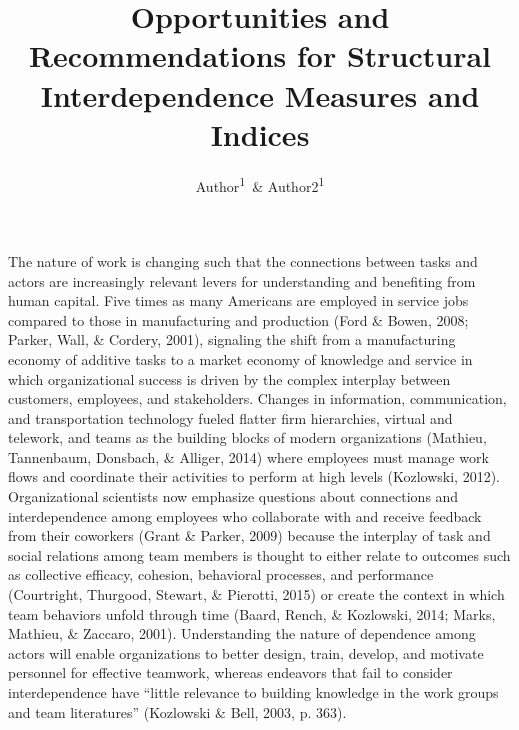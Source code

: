 \documentclass[english,,man]{apa6}
\title{Opportunities and Recommendations for Structural Interdependence
Measures and Indices}
\author{Author\textsuperscript{1}~\& Author2\textsuperscript{1}}
\date{}
\affiliation{
\vspace{0.5cm}
\textsuperscript{1} Michigan State University}
\theoremstyle{definition}
\theoremstyle{definition}
\theoremstyle{definition}
\theoremstyle{remark}
\begin{document}
\maketitle

The nature of work is changing such that the connections between tasks
and actors are increasingly relevant levers for understanding and
benefiting from human capital. Five times as many Americans are employed
in service jobs compared to those in manufacturing and production (Ford
\& Bowen, 2008; Parker, Wall, \& Cordery, 2001), signaling the shift
from a manufacturing economy of additive tasks to a market economy of
knowledge and service in which organizational success is driven by the
complex interplay between customers, employees, and stakeholders.
Changes in information, communication, and transportation technology
fueled flatter firm hierarchies, virtual and telework, and teams as the
building blocks of modern organizations (Mathieu, Tannenbaum, Donsbach,
\& Alliger, 2014) where employees must manage work flows and coordinate
their activities to perform at high levels (Kozlowski, 2012).
Organizational scientists now emphasize questions about connections and
interdependence among employees who collaborate with and receive
feedback from their coworkers (Grant \& Parker, 2009) because the
interplay of task and social relations among team members is thought to
either relate to outcomes such as collective efficacy, cohesion,
behavioral processes, and performance (Courtright, Thurgood, Stewart, \&
Pierotti, 2015) or create the context in which team behaviors unfold
through time (Baard, Rench, \& Kozlowski, 2014; Marks, Mathieu, \&
Zaccaro, 2001). Understanding the nature of dependence among actors will
enable organizations to better design, train, develop, and motivate
personnel for effective teamwork, whereas endeavors that fail to
consider interdependence have \enquote{little relevance to building
knowledge in the work groups and team literatures} (Kozlowski \& Bell,
2003, p. 363).
\end{document}
